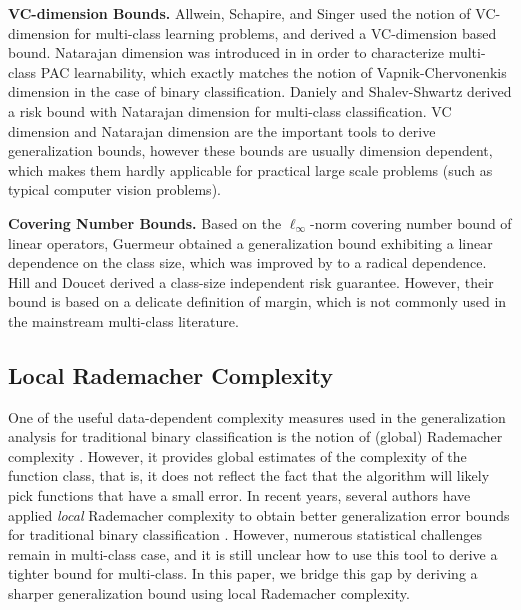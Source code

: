 \documentclass{article}
\begin{document}
\textbf{VC-dimension Bounds.}
    Allwein, Schapire, and Singer   used the notion of VC-dimension
    for multi-class learning problems,
    and derived a VC-dimension based bound.
    Natarajan dimension was introduced in \cite{Natarajan1989} in
    order to characterize multi-class PAC learnability,
    which exactly matches the notion of Vapnik-Chervonenkis
    dimension in the case of binary classification.
    Daniely and Shalev-Shwartz  derived a risk bound with Natarajan dimension for multi-class classification.
    VC dimension and Natarajan dimension are the important tools to derive generalization bounds,
    however these bounds are usually dimension
    dependent, which makes them hardly applicable for practical large
    scale problems (such as typical computer vision problems).

\textbf{Covering Number  Bounds.}
    Based on the $\ell_\infty$-norm covering number bound of
    linear operators, Guermeur  obtained
    a generalization bound exhibiting a linear dependence on the class size,
    which was improved by \cite{zhang2004statistical} to a radical dependence.
    Hill and Doucet  derived a class-size independent risk guarantee.
    However, their bound is based on a delicate definition of margin,
    which is not commonly used in the mainstream multi-class literature.
\subsection{Local Rademacher Complexity}
One of the useful data-dependent complexity measures used in the generalization analysis
for  traditional  binary classification
is the notion of (global) Rademacher complexity \cite{bartlett2003rademacher}.
However,
it provides global estimates of the complexity of the function class,
that is, it does not reflect
the fact that the algorithm will likely pick functions that have a small error.
In recent years,
several authors have applied
 \emph{local} Rademacher complexity to obtain  better generalization error bounds
for traditional binary classification \cite{Bartlett2005lrc,Koltchinskii2006lrcoiirm}.
However,
numerous statistical challenges remain in multi-class case, and it is still unclear how to use
this tool to derive a tighter bound for multi-class.
In this paper,
we bridge this gap by deriving a sharper generalization bound using local Rademacher complexity.
\end{document}
